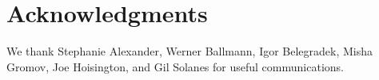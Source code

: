 \documentclass[11pt]{amsart}
\theoremstyle{definition}
\begin{document}
\section*{Acknowledgments}
We thank Stephanie Alexander, Werner Ballmann,  Igor Belegradek, Misha Gromov, Joe Hoisington, and Gil Solanes for useful communications.




\end{document}
